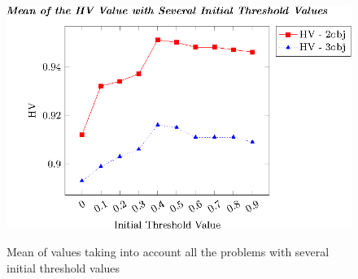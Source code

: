 \begin{figure}[t]
\centering
\includegraphics[scale=0.85]{Images/Graphic-Initial-Distance_tikz-figure0.eps} \\
\caption{Mean of \HV{} values taking into account all the problems with several initial threshold values}\label{fig:Initial-distance-factor}
\end{figure}
